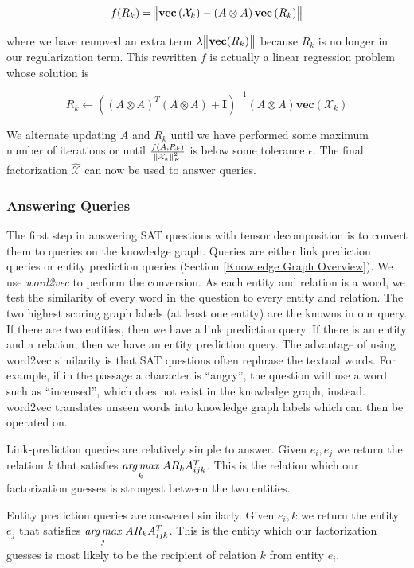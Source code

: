 \documentclass[pageno]{final_paper}
\begin{document}
$$f(R_k) = \norm{\textbf{vec}\left(\mathcal{X}_k\right) - \left(A \otimes A \right)
\textbf{vec}\left(R_k\right)}$$

where we have removed an extra term $\lambda \norm{\textbf{vec}(R_k)}$ because
$R_k$ is no longer in our regularization term. This rewritten $f$ is actually
a linear regression problem whose solution is

$$R_k \leftarrow \left( \left(A \otimes A \right)^T \left(A \otimes A\right) + \textbf{I}
 \right) ^{-1} \left(A \otimes A\right) \textbf{vec}\left(\mathcal{X}_k\right)$$

We alternate updating $A$ and $R_k$ until we have performed some maximum number
of iterations or until $\frac{f(A, R_k)}{\norm{\mathcal{X}_k}_F^2}$ is below
some tolerance $\epsilon$. The final factorization $\hat{\mathcal{X}}$ can now
be used to answer queries.

\subsubsection{Answering Queries}
\label{Answering Queries}

The first step in answering SAT questions with tensor decomposition is to
convert them to queries on the knowledge graph. Queries are either link
prediction queries or entity prediction queries (Section \ref{Knowledge Graph
Overview}). We use \textit{word2vec} to perform the conversion. As each entity
and relation is a word, we test the similarity of every word in the question to
every entity and relation. The two highest scoring graph labels (at least one
entity) are the knowns in our query. If there are two entities, then we have a
link prediction query. If there is an entity and a relation, then we have an
entity prediction query. The advantage of using word2vec similarity is that SAT
questions often rephrase the textual words. For example, if in the passage a
character is ``angry'', the question will use a word such as ``incensed'', which
does not exist in the knowledge graph, instead. word2vec translates unseen words
into  knowledge graph labels which can then be operated on.

Link-prediction queries are relatively simple to answer. Given $e_i, e_j$ we
return the relation $k$ that satisfies $\underset{k}{{\textit{arg}}\,{\textit{max}}}\,\, AR_kA^T_{ijk}$.
This is the relation which our factorization guesses is strongest between the
two entities.

Entity prediction queries are answered similarly. Given $e_i, k$ we return the
entity $e_j$ that satisfies $\underset{j}{{\textit{arg}}\,{\textit{max}}}\,\, AR_kA^T_{ijk}$. This is
the entity which our factorization guesses is most likely to be the recipient of
relation $k$ from entity $e_i$.
\end{document}
